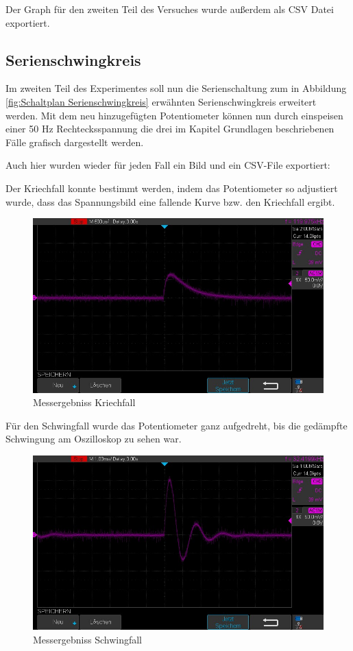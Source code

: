 \documentclass[12pt,a4paper,twoside]{article}
\begin{document}
\noindent 
Der Graph für den zweiten Teil des Versuches wurde außerdem als CSV Datei exportiert.


\subsection{Serienschwingkreis}

Im zweiten Teil des Experimentes soll nun die Serienschaltung zum in Abbildung \ref{fig:Schaltplan Serienschwingkreis} erwähnten Serienschwingkreis erweitert werden.
Mit dem neu hinzugefügten Potentiometer können nun durch einspeisen einer 50 Hz Rechtecksspannung die drei im Kapitel Grundlagen beschriebenen Fälle grafisch dargestellt werden. \newline

\noindent
Auch hier wurden wieder für jeden Fall ein Bild und ein CSV-File exportiert: \newline

\noindent
Der Kriechfall konnte bestimmt werden, indem das Potentiometer so adjustiert wurde, dass das Spannungsbild eine fallende Kurve bzw. den Kriechfall ergibt.

\begin{figure}[H]
    \centering
    \includegraphics[width=0.6\linewidth, angle=0]{Messergebnisse/3.3 Kriechfall/KriechfallNahe.jpg}
    \caption{Messergebniss Kriechfall}
    \label{fig:MessergebnissKriechfall}
\end{figure}

\noindent
Für den Schwingfall wurde das Potentiometer ganz aufgedreht, bis die gedämpfte Schwingung am Oszilloskop zu sehen war.

\begin{figure}[H]
    \centering
    \includegraphics[width=0.6\linewidth, angle=0]{Messergebnisse/3.3 Schwingfall/SchwingfallNahe.jpg}
    \caption{Messergebniss Schwingfall}
    \label{fig:MessergebnissSchwingfall}
\end{figure}
\end{document}

